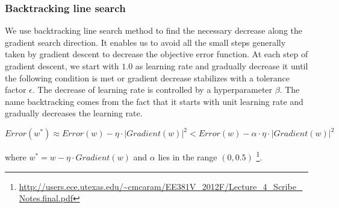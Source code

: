 \subsubsection{Backtracking line search}
We use backtracking line search method to find the necessary decrease along the gradient search direction. It enables us to avoid all the small steps generally taken by gradient descent to decrease the objective error function. At each step of gradient descent, we start with $1.0$ as learning rate and gradually decrease it until the following condition is met or gradient decrease stabilizes with a tolerance factor $\epsilon$. The decrease of learning rate is controlled by a hyperparameter $\beta$. The name backtracking comes from the fact that it starts with unit learning rate and gradually decreases the learning rate.

\begin{equation}
Error(w^*) \approx Error(w) - \eta \cdot |Gradient(w)| ^ 2 < Error(w) - \alpha \cdot \eta \cdot |Gradient(w)| ^ 2
\end{equation}

where $w^* = w - \eta \cdot Gradient(w)$ and $\alpha$ lies in the range $\left(0, 0.5\right)$ \footnote{\url{http://users.ece.utexas.edu/~cmcaram/EE381V_2012F/Lecture_4_Scribe_Notes.final.pdf}}.

